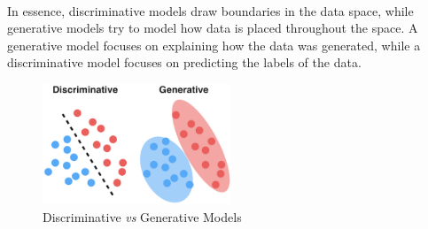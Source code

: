     \paragraph{}
    
    In essence, discriminative models draw boundaries in the data space, while generative models try to model how data is placed throughout the space. A generative model focuses on explaining how the data was generated, while a discriminative model focuses on predicting the labels of the data.
    
    \begin{figure}
        \centering
        \includegraphics[width=0.5\textwidth]{images/descriminative_generative.png}
        \caption{Discriminative \textit{vs} Generative Models}
        \label{descriminative_generative}
    \end{figure}
